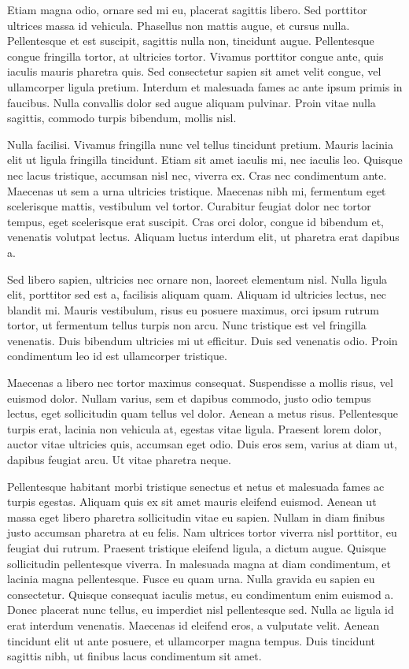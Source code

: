 Etiam magna odio, ornare sed mi eu, placerat sagittis libero. Sed porttitor ultrices massa id vehicula. Phasellus non mattis augue, et cursus nulla. Pellentesque et est suscipit, sagittis nulla non, tincidunt augue. Pellentesque congue fringilla tortor, at ultricies tortor. Vivamus porttitor congue ante, quis iaculis mauris pharetra quis. Sed consectetur sapien sit amet velit congue, vel ullamcorper ligula pretium. Interdum et malesuada fames ac ante ipsum primis in faucibus. Nulla convallis dolor sed augue aliquam pulvinar. Proin vitae nulla sagittis, commodo turpis bibendum, mollis nisl.

Nulla facilisi. Vivamus fringilla nunc vel tellus tincidunt pretium. Mauris lacinia elit ut ligula fringilla tincidunt. Etiam sit amet iaculis mi, nec iaculis leo. Quisque nec lacus tristique, accumsan nisl nec, viverra ex. Cras nec condimentum ante. Maecenas ut sem a urna ultricies tristique. Maecenas nibh mi, fermentum eget scelerisque mattis, vestibulum vel tortor. Curabitur feugiat dolor nec tortor tempus, eget scelerisque erat suscipit. Cras orci dolor, congue id bibendum et, venenatis volutpat lectus. Aliquam luctus interdum elit, ut pharetra erat dapibus a.

Sed libero sapien, ultricies nec ornare non, laoreet elementum nisl. Nulla ligula elit, porttitor sed est a, facilisis aliquam quam. Aliquam id ultricies lectus, nec blandit mi. Mauris vestibulum, risus eu posuere maximus, orci ipsum rutrum tortor, ut fermentum tellus turpis non arcu. Nunc tristique est vel fringilla venenatis. Duis bibendum ultricies mi ut efficitur. Duis sed venenatis odio. Proin condimentum leo id est ullamcorper tristique.

Maecenas a libero nec tortor maximus consequat. Suspendisse a mollis risus, vel euismod dolor. Nullam varius, sem et dapibus commodo, justo odio tempus lectus, eget sollicitudin quam tellus vel dolor. Aenean a metus risus. Pellentesque turpis erat, lacinia non vehicula at, egestas vitae ligula. Praesent lorem dolor, auctor vitae ultricies quis, accumsan eget odio. Duis eros sem, varius at diam ut, dapibus feugiat arcu. Ut vitae pharetra neque.

Pellentesque habitant morbi tristique senectus et netus et malesuada fames ac turpis egestas. Aliquam quis ex sit amet mauris eleifend euismod. Aenean ut massa eget libero pharetra sollicitudin vitae eu sapien. Nullam in diam finibus justo accumsan pharetra at eu felis. Nam ultrices tortor viverra nisl porttitor, eu feugiat dui rutrum. Praesent tristique eleifend ligula, a dictum augue. Quisque sollicitudin pellentesque viverra. In malesuada magna at diam condimentum, et lacinia magna pellentesque. Fusce eu quam urna. Nulla gravida eu sapien eu consectetur. Quisque consequat iaculis metus, eu condimentum enim euismod a. Donec placerat nunc tellus, eu imperdiet nisl pellentesque sed. Nulla ac ligula id erat interdum venenatis. Maecenas id eleifend eros, a vulputate velit. Aenean tincidunt elit ut ante posuere, et ullamcorper magna tempus. Duis tincidunt sagittis nibh, ut finibus lacus condimentum sit amet.

